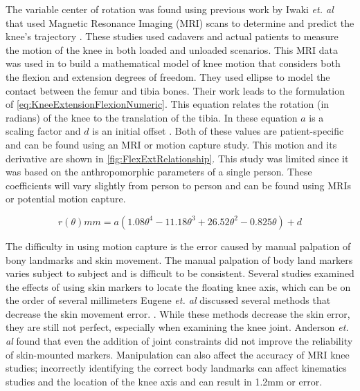 The variable center of rotation was found using previous work by Iwaki \textit{et. al} that used Magnetic Resonance Imaging (MRI) scans to determine and predict the knee's trajectory \cite{MRIKneeShape_Loaded, MRIKneeShape_Unloaded}. These studies used cadavers and actual patients to measure the motion of the knee in both loaded and unloaded scenarios. This MRI data was used in \cite{KinDynKneeJoint} to build a mathematical model of knee motion that considers both the flexion and extension degrees of freedom. They used ellipse to model the contact between the femur and tibia bones. Their work leads to the formulation of \autoref{eq:KneeExtensionFlexionNumeric}. This equation relates the rotation (in radians) of the knee to the translation of the tibia. In these equation $a$ is a scaling factor and $d$ is an initial offset \cite{wang2013adaptive}. Both of these values are patient-specific and can be found using an MRI or motion capture study. This motion and its derivative are shown in \autoref{fig:FlexExtRelationship}. This study was limited since it was based on the anthropomorphic parameters of a single person. These coefficients will vary slightly from person to person and can be found using MRIs or potential motion capture. 

\begin{equation}
    r(\theta) mm = a(1.08\theta^4 - 11.18\theta^3 + 26.52\theta^2 - 0.825\theta) + d
    \label{eq:KneeExtensionFlexionNumeric}
\end{equation}


The difficulty in using motion capture is the error caused by manual palpation of bony landmarks and skin movement. The manual palpation of body land markers varies subject to subject and is difficult to be consistent. Several studies examined the effects of using skin markers to locate the floating knee axis, which can be on the order of several millimeters Eugene \textit{et. al} discussed several methods that decrease the skin movement error. \cite{alexander2001correcting} \cite{cappozzo1996position}. While these methods decrease the skin error, they are still not perfect, especially when examining the knee joint. Anderson \textit{et. al} found that even the addition of joint constraints did not improve the reliability of skin-mounted markers. Manipulation can also affect the accuracy of MRI knee studies; incorrectly identifying the correct body landmarks can affect kinematics studies and the location of the knee axis \cite{lerner2003use} and can result in 1.2mm or error. 





